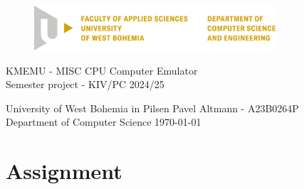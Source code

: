 \documentclass[12pt,a4paper]{paper}
\begin{document}
\begin{figure}[H]
	\centering
	\includegraphics[width=0.8\textwidth]{pic/kiv-cmyk-en}
\end{figure}

\begin{center}
	\vspace{.5cm}
	\LARGE{KMEMU - MISC CPU Computer Emulator}\\
	\large{Semester project - KIV/PC 2024/25}
\end{center}

\vfill

\noindent
University of West Bohemia in Pilsen \hfill Pavel Altmann - A23B0264P\\
Department of Computer Science \hfill \today
\thispagestyle{empty}

\newpage
\setcounter{page}{1}

\tableofcontents

\newpage

\section{Assignment}
\end{document}

